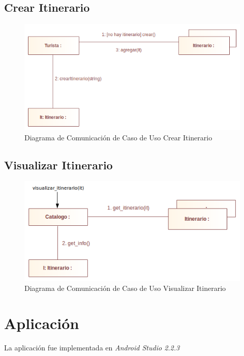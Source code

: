 \documentclass[12pt]{article}
\begin{document}
\subsection{Crear Itinerario}
\begin{center}\begin{figure}[htp]
\centering
\includegraphics[scale=0.60]{Diagramas/Comunicacion/crear_itinerario.png}
\caption{Diagrama de Comunicación de Caso de Uso Crear Itinerario}
\label{}
\end{figure}\end{center}
\subsection{Visualizar Itinerario}
\begin{center}\begin{figure}[htp]
\centering
\includegraphics[scale=0.65]{Diagramas/Comunicacion/visualizar_itinerario.png}
\caption{Diagrama de Comunicación de Caso de Uso Visualizar Itinerario}
\label{}
\end{figure}\end{center}
\newpage
%
%
\section{Aplicación}
La aplicación fue implementada en \emph{Android Studio 2.2.3}
\newpage
\end{document}
